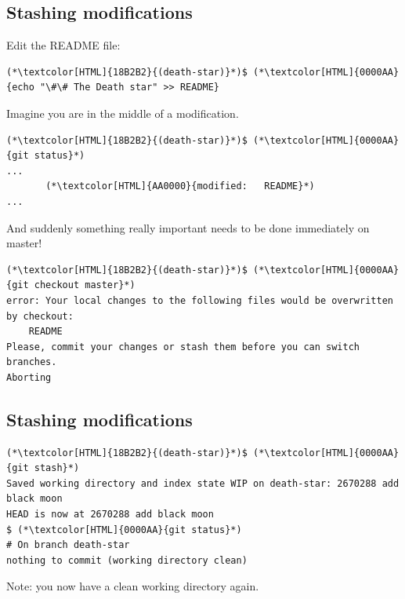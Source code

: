 \subsection{Stashing modifications}
\begin{frame}[fragile]
  \subslidetitle

  Edit the README file:
  \begin{lstlisting}
(*\textcolor[HTML]{18B2B2}{(death-star)}*)$ (*\textcolor[HTML]{0000AA}{echo "\#\# The Death star" >> README}
\end{lstlisting}

  Imagine you are in the middle of a modification.

  \begin{lstlisting}
(*\textcolor[HTML]{18B2B2}{(death-star)}*)$ (*\textcolor[HTML]{0000AA}{git status}*)
...
       (*\textcolor[HTML]{AA0000}{modified:   README}*)
...
\end{lstlisting}

  And suddenly something really important needs to be done immediately on master!

  \begin{lstlisting}
(*\textcolor[HTML]{18B2B2}{(death-star)}*)$ (*\textcolor[HTML]{0000AA}{git checkout master}*)
error: Your local changes to the following files would be overwritten by checkout:
	README
Please, commit your changes or stash them before you can switch branches.
Aborting
\end{lstlisting}
\end{frame}

\subsection{Stashing modifications}
\begin{frame}[fragile]
  \subslidetitle

  \begin{lstlisting}
(*\textcolor[HTML]{18B2B2}{(death-star)}*)$ (*\textcolor[HTML]{0000AA}{git stash}*)
Saved working directory and index state WIP on death-star: 2670288 add black moon
HEAD is now at 2670288 add black moon
$ (*\textcolor[HTML]{0000AA}{git status}*)
# On branch death-star
nothing to commit (working directory clean)
\end{lstlisting}
  Note: you now have a clean working directory again.
\end{frame}

